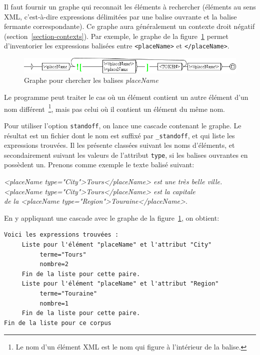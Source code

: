 \bigskip
\noindent Il faut fournir un graphe qui reconnait les éléments à rechercher (éléments au sens XML,
c'est-à-dire expressions délimitées par une balise ouvrante et la balise fermante correspondante).
Ce graphe aura généralement un contexte droit négatif (section~\ref{section-contexts}). 
Par exemple, le graphe de la figure~\ref{fig-placeNameStandoff} permet d'inventorier les expressions
balisées entre \verb$<placeName>$ et  \verb$</placeName>$.

\begin{figure}[!htb]
  \centering
  \includegraphics[width=15cm]{resources/img/placeNameStandoff.png}
  \caption{Graphe pour chercher les balises \emph{placeName}}
  \label{fig-placeNameStandoff}
\end{figure}

\noindent Le programme peut traiter le cas où un élément contient un autre élément d'un nom
différent~\footnote{Le nom d'un élément XML est le nom qui figure à l'intérieur de la balise.}, mais
pas celui où il contient un élément du même nom. 

\bigskip
\noindent Pour utiliser l'option \verb$standoff$, on lance une cascade contenant le graphe. Le résultat
est un fichier dont le nom est suffixé par \verb$_standoff$, et
qui liste les expressions trouvées. Il les présente classées suivant les noms d'éléments,
et secondairement suivant les valeurs de l'attribut \verb$type$, si les balises ouvrantes en possèdent
un. Prenons comme exemple le texte balisé suivant:

\bigskip
\noindent \emph{<placeName type="City">Tours</placeName> est une très belle ville. \\
<placeName type="City">Tours</placeName> est la capitale \\
de la <placeName type="Region">Touraine</placeName>}.

\bigskip
\noindent En y appliquant une cascade avec le graphe de la figure~\ref{fig-placeNameStandoff},
on obtient:
\begin{verbatim}
Voici les expressions trouvées :
     Liste pour l'élément "placeName" et l'attribut "City" 
          terme="Tours" 
          nombre=2 
     Fin de la liste pour cette paire.
     Liste pour l'élément "placeName" et l'attribut "Region" 
          terme="Touraine" 
          nombre=1 
     Fin de la liste pour cette paire.
Fin de la liste pour ce corpus
\end{verbatim}

